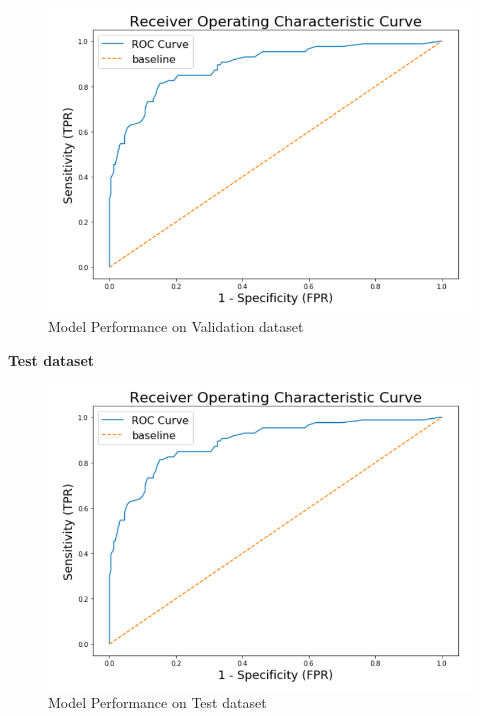 \documentclass[
  letterpaper,
  DIV=11,
  numbers=noendperiod]{scrartcl}
\begin{document}
\begin{figure}

{\centering \includegraphics{Images/roc.png}

}

\caption{Model Performance on Validation dataset}

\end{figure}

\textbf{Test dataset}

\begin{figure}

{\centering \includegraphics{Images/roc.png}

}

\caption{Model Performance on Test dataset}

\end{figure}
\end{document}
